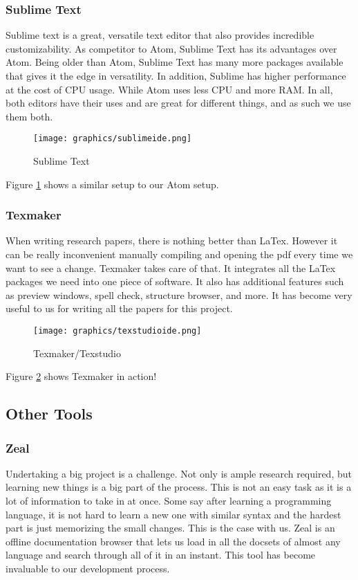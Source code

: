 \documentclass[letterpaper, 12pt]{article}
\begin{document}
\newpage

\subsubsection{Sublime Text}
Sublime text is a great, versatile text editor that also provides incredible customizability.
As competitor to Atom, Sublime Text has its advantages over Atom. Being older than Atom,
Sublime Text has many more packages available that gives it the edge in versatility. In
addition, Sublime has higher performance at the cost of CPU usage. While Atom uses less
CPU and more RAM. In all, both editors have their uses and are great for different things,
and as such we use them both.  

\begin{figure}
    \centering
	\texttt{[image: graphics/sublimeide.png]}
    \caption{Sublime Text} \label{sublime}
\end{figure}

Figure \ref{sublime} shows a similar setup to our Atom setup.

\newpage

\subsubsection{Texmaker}
When writing research papers, there is nothing better than LaTex. However it can be really
inconvenient manually compiling and opening the pdf every time we want to see a change.
Texmaker takes care of that. It integrates all the LaTex packages we need into one piece
of software. It also has additional features such as preview windows, spell check,
structure browser, and more. It has become very useful to us for writing all the
papers for this project.

\begin{figure}
    \centering
	\texttt{[image: graphics/texstudioide.png]}
    \caption{Texmaker/Texstudio} \label{texmaker}
\end{figure}

Figure \ref{texmaker} shows Texmaker in action!

\newpage

\subsection{Other Tools}

\subsubsection{Zeal}
Undertaking a big project is a challenge. Not only is ample research required, but learning
new things is a big part of the process. This is not an easy task as it is a lot of information
to take in at once. Some say after learning a programming language, it is not hard to learn a
new one with similar syntax and the hardest part is just memorizing the small changes. This
is the case with us. Zeal is an offline documentation browser that lets us load in all
the docsets of almost any language and search through all of it in an instant. This tool
has become invaluable to our development process.
\end{document}
